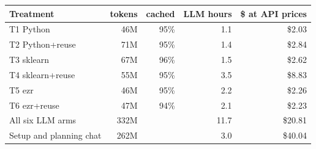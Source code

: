 \begin{tabular}{lrrrr}
\toprule
Treatment & tokens & cached & LLM hours & \$ at API prices \\
\midrule
T1 Python & 46M & 95\% & 1.1 & \$2.03 \\
T2 Python+reuse & 71M & 95\% & 1.4 & \$2.84 \\
T3 sklearn & 67M & 96\% & 1.5 & \$2.62 \\
T4 sklearn+reuse & 55M & 95\% & 3.5 & \$8.83 \\
T5 ezr & 46M & 95\% & 2.2 & \$2.26 \\
T6 ezr+reuse & 47M & 94\% & 2.1 & \$2.23 \\
\midrule All six LLM arms & 332M & & 11.7 & \$20.81 \\
Setup and planning chat & 262M & & 3.0 & \$40.04 \\
\bottomrule
\end{tabular}